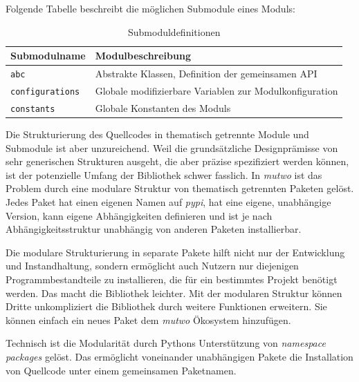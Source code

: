 \documentclass[12pt,a4paper,ngerman]{article}
\begin{document}
Folgende Tabelle beschreibt die möglichen Submodule eines Moduls:

\begin{table}[h!]
    \begin{center}
        \begin{tabular}{l l} 
            \hline
            Submodulname & Modulbeschreibung \\ [0.5ex] 
            \hline\hline
            \texttt{abc} & Abstrakte Klassen, Definition der gemeinsamen API \\
            \texttt{configurations} & Globale modifizierbare Variablen zur Modulkonfiguration \\
            \texttt{constants} & Globale Konstanten des Moduls \\
            \hline
        \end{tabular}
    \end{center}

    \caption{Submoduldefinitionen}
\end{table}

Die Strukturierung des Quellcodes in thematisch getrennte Module und Submodule ist aber unzureichend.
Weil die grundsätzliche Designprämisse von sehr generischen Strukturen ausgeht, die aber präzise spezifiziert werden können, ist der potenzielle Umfang der Bibliothek schwer fasslich.
In \emph{mutwo} ist das Problem durch eine modulare Struktur von thematisch getrennten Paketen gelöst.
Jedes Paket hat einen eigenen Namen auf \emph{pypi}, hat eine eigene, unabhängige Version, kann eigene Abhängigkeiten definieren und ist je nach Abhängigkeitsstruktur unabhängig von anderen Paketen installierbar.

\bigskip

Die modulare Strukturierung in separate Pakete hilft nicht nur der Entwicklung und Instandhaltung, sondern ermöglicht auch Nutzern nur diejenigen Programmbestandteile zu installieren, die für ein bestimmtes Projekt benötigt werden.
Das macht die Bibliothek leichter.
Mit der modularen Struktur können Dritte unkompliziert die Bibliothek durch weitere Funktionen erweitern.
Sie können einfach ein neues Paket dem \emph{mutwo} Ökosystem hinzufügen.

\bigskip

Technisch ist die Modularität durch Pythons Unterstützung von \emph{namespace packages} gelöst.
Das ermöglicht voneinander unabhängigen Pakete die Installation von Quellcode unter einem gemeinsamen Paketnamen.

\bigskip
\end{document}
